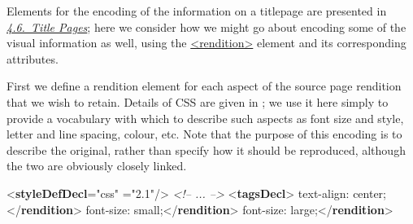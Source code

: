  Elements for the encoding of the information on a titlepage are presented in \textit{\hyperref[DSTITL]{4.6.\ Title Pages}}; here we consider how we might go about encoding some of the visual information as well, using the \hyperref[TEI.rendition]{<rendition>} element and its corresponding attributes.\par
First we define a rendition element for each aspect of the source page rendition that we wish to retain. Details of CSS are given in \cite{CSS21}; we use it here simply to provide a vocabulary with which to describe such aspects as font size and style, letter and line spacing, colour, etc. Note that the purpose of this encoding is to describe the original, rather than specify how it should be reproduced, although the two are obviously closely linked. \par\bgroup{}\exampleFont \begin{shaded}\noindent\mbox{}{<\textbf{styleDefDecl}\hspace*{1em}{scheme}="{css}"\mbox{}\newline 
\hspace*{1em}{schemeVersion}="{2.1}"/>}\mbox{}\newline 
\textit{<!-- ... -->}\mbox{}\newline 
{<\textbf{tagsDecl}>}\mbox{}\newline 
{}text-align: center;{</\textbf{rendition}>}\mbox{}\newline 
{}font-size: small;{</\textbf{rendition}>}\mbox{}\newline 
{}font-size: large;{</\textbf{rendition}>}\mbox{}\newline 

\end{shaded}
